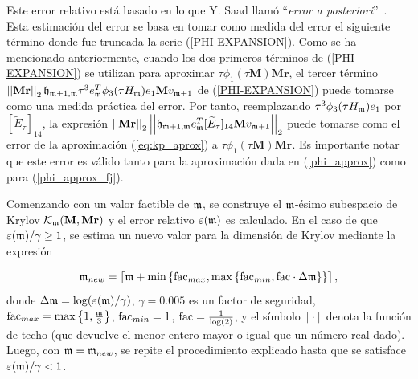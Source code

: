 Este error relativo está basado en lo que Y. Saad llamó ``\textit{error a posteriori}''~\cite{Saad92}. Esta estimación del error se basa en tomar como medida del error el siguiente término donde fue truncada la serie (\ref{PHI-EXPANSION}). Como se ha mencionado anteriormente, cuando los dos primeros términos de (\ref{PHI-EXPANSION}) se utilizan para aproximar $\tau\phi_1(\tau \mathbf{M})\mathbf{Mr}$, el tercer término $\left\lvert\left\lvert \mathbf{Mr} \right\rvert\right\rvert_2 \mathfrak{h}_{\mathfrak{m}+1,\mathfrak{m}} \tau^{3} e_{\mathfrak{m}}^{T}\phi_3( \tau H_{\mathfrak{m}})e_1 \mathbf{M} v_{\mathfrak{m}+1} $ de (\ref{PHI-EXPANSION}) puede tomarse como una medida práctica del error. Por tanto, reemplazando $\tau^3\phi_3( \tau H_{\mathfrak{m}})e_1$ por $[\widetilde{E}_{\tau}]_{14}$, la expresión $\left\lvert \left\lvert \mathbf{Mr} \right\rvert\right\rvert_2 \left\lvert\left\lvert \mathfrak{h}_{\mathfrak{m}+1,\mathfrak{m}} e_{\mathfrak{m}}^{T}[\widetilde{E}_{\tau}]_{14} \mathbf{M} v_{\mathfrak{m}+1} \right\rvert\right\rvert_2$ puede tomarse como el error de la aproximación (\ref{eq:kp_aprox}) a $\tau\phi_1(\tau \mathbf{M})\mathbf{Mr}$. Es importante notar que este error es válido tanto para la aproximación dada en (\ref{phi_approx}) como para (\ref{phi_approx_fj}).

\begin{sloppypar}
Comenzando con un valor factible de $\mathfrak{m}$, se construye el $\mathfrak{m}$-ésimo subespacio de Krylov $\mathcal{K}_{\mathfrak{m}}(\mathbf{M},\mathbf{Mr})$ y el error relativo $\varepsilon(\mathfrak{m})$ es calculado. En el caso de que $\varepsilon(\mathfrak{m})/\gamma \geq 1$, se estima un nuevo valor para la dimensión de Krylov mediante la expresión
\end{sloppypar}
\begin{equation*}
	\mathfrak{m}_{new} = \left\lceil \mathfrak{m} + \min\left\{ \mathrm{fac}_{max} , \max\left\{ \mathrm{fac}_{min},
	\mathrm{fac}\cdot\Delta\mathfrak{m} \right\}  \right\} \right\rceil,
\end{equation*}
donde $\Delta\mathfrak{m}=\log(\varepsilon(\mathfrak{m})/\gamma)$, $\gamma=0.005$ es un factor de seguridad, $\mathrm{fac}_{max}= \max\left\{  1, \frac{\mathfrak{m}}{3}  \right\}$, $\mathrm{fac}_{min}= 1 $, $\mathrm{fac}=\frac{1}{\log(2)}$, y el símbolo $\left\lceil \cdot \right\rceil$ denota la función de techo (que devuelve el menor entero mayor o igual que un número real dado). Luego, con $\mathfrak{m}=\mathfrak{m}_{new}$, se repite el procedimiento explicado hasta que se satisface $\varepsilon(\mathfrak{m})/\gamma< 1$.

